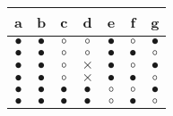 \vspace{.5cm}

\noindent\begin{minipage}{\linewidth}
     \hfill
    \begin{minipage}[t]{.99\linewidth}
    \centering    
          \begin{tabular}{|c|c|c|c|c|c|c|}
		\hline
			a & b &c & d &e &  f & g \\
		\hline
			$\bullet$ &$\bullet$ &$\circ$ &$\circ$ &$\bullet$ &$\circ$ &$\bullet$  \\ \hline$\bullet$ &$\bullet$ &$\circ$ &$\circ$ &$\bullet$ &$\bullet$ &$\circ$  \\ \hline$\bullet$ &$\bullet$ &$\circ$ &$\times$ &$\bullet$ &$\circ$ &$\bullet$  \\ \hline$\bullet$ &$\bullet$ &$\circ$ &$\times$ &$\bullet$ &$\bullet$ &$\circ$  \\ \hline$\bullet$ &$\bullet$ &$\bullet$ &$\bullet$ &$\circ$ &$\circ$ &$\bullet$  \\ \hline$\bullet$ &$\bullet$ &$\bullet$ &$\bullet$ &$\circ$ &$\bullet$ &$\circ$  \\   \hline \end{tabular}
	
       \label{twoooooo}
    \end{minipage}    
    \label{mini:join3things}
\end{minipage}\hfill\null

